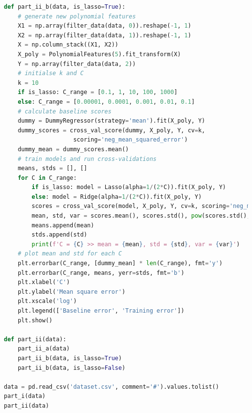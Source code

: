 \documentclass[12pt]{article}
\begin{document}
\begin{lstlisting}[language=Python]
def part_ii_b(data, is_lasso=True):
    # generate new polynomial features
    X1 = np.array(filter_data(data, 0)).reshape(-1, 1)
    X2 = np.array(filter_data(data, 1)).reshape(-1, 1)
    X = np.column_stack((X1, X2))
    X_poly = PolynomialFeatures(5).fit_transform(X)
    Y = np.array(filter_data(data, 2))
    # initialse k and C
    k = 10
    if is_lasso: C_range = [0.1, 1, 10, 100, 1000]
    else: C_range = [0.00001, 0.0001, 0.001, 0.01, 0.1]
    # calculate baseline scores
    dummy = DummyRegressor(strategy='mean').fit(X_poly, Y)
    dummy_scores = cross_val_score(dummy, X_poly, Y, cv=k,
                    scoring='neg_mean_squared_error')
    dummy_mean = dummy_scores.mean()
    # train models and run cross-validations
    means, stds = [], []
    for C in C_range:
        if is_lasso: model = Lasso(alpha=1/(2*C)).fit(X_poly, Y)
        else: model = Ridge(alpha=1/(2*C)).fit(X_poly, Y)
        scores = cross_val_score(model, X_poly, Y, cv=k, scoring='neg_mean_squared_error')
        mean, std, var = scores.mean(), scores.std(), pow(scores.std(), 2)
        means.append(mean)
        stds.append(std)
        print(f'C = {C} >> mean = {mean}, std = {std}, var = {var}')
    # plot mean and std for each C
    plt.errorbar(C_range, [dummy_mean] * len(C_range), fmt='y')
    plt.errorbar(C_range, means, yerr=stds, fmt='b')
    plt.xlabel('C')
    plt.ylabel('Mean square error')
    plt.xscale('log')
    plt.legend(['Baseline error', 'Training error'])
    plt.show()
        
def part_ii(data):
    part_ii_a(data)
    part_ii_b(data, is_lasso=True)
    part_ii_b(data, is_lasso=False)

data = pd.read_csv('dataset.csv', comment='#').values.tolist()
part_i(data)
part_ii(data)
\end{lstlisting}
\end{document}
